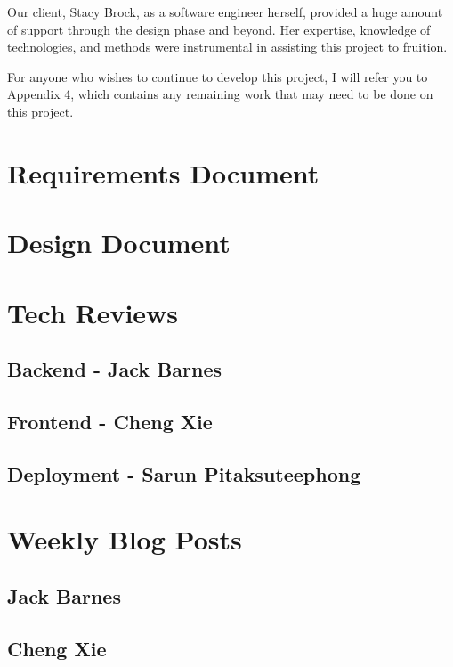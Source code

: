 \documentclass[onecolumn, draftclsnofoot,10pt, compsoc]{IEEEtran}
\begin{document}
Our client, Stacy Brock, as a software engineer herself, provided a huge amount of support through the design phase and beyond.
Her expertise, knowledge of technologies, and methods were instrumental in assisting this project to fruition.

For anyone who wishes to continue to develop this project, I will refer you to Appendix 4, which contains any remaining work that may need to be done on this project.

\section{Requirements Document}


\section{Design Document}


\section{Tech Reviews}
\subsection{Backend - Jack Barnes}


\subsection{Frontend - Cheng Xie}


\subsection{Deployment - Sarun Pitaksuteephong}


\section{Weekly Blog Posts}
\subsection{Jack Barnes}


\subsection{Cheng Xie}

\end{document}
